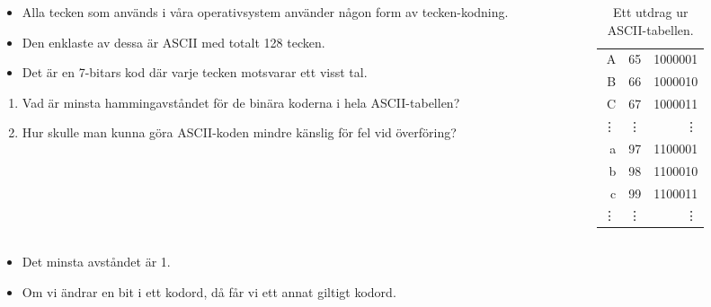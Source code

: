 \begin{frame}
  \begin{columns}
    \begin{column}{0.7\columnwidth}
      \begin{exercise}
        \begin{itemize}
          \item Alla tecken som används i våra operativsystem använder någon 
            form av tecken-kodning.
          \item Den enklaste av dessa är ASCII med totalt 128 tecken.
          \item Det är en 7-bitars kod där varje tecken motsvarar ett visst 
            tal.
        \end{itemize}
        \begin{enumerate}
          \item Vad är minsta hammingavståndet för de binära koderna i hela 
            ASCII-tabellen?
          \item Hur skulle man kunna göra ASCII-koden mindre känslig för fel 
            vid överföring?
        \end{enumerate}
      \end{exercise}
    \end{column}
    \begin{column}{0.3\columnwidth}
      \begin{table}
        \begin{tabular}{rrr}
          A & 65 & 1000001 \\
          B & 66 & 1000010 \\
          C & 67 & 1000011 \\
          \vdots & \vdots & \vdots \\
          a & 97 & 1100001 \\
          b & 98 & 1100010 \\
          c & 99 & 1100011 \\
          \vdots & \vdots & \vdots
        \end{tabular}
        \caption{Ett utdrag ur ASCII-tabellen.}
      \end{table}
    \end{column}
  \end{columns}
\end{frame}

\begin{frame}
  \begin{solution}
    \begin{itemize}
      \item Det minsta avståndet är \SI{1}{\bit}.
      \item Om vi ändrar en bit i ett kodord, då får vi ett annat giltigt 
        kodord.
    \end{itemize}
  \end{solution}
\end{frame}

%
